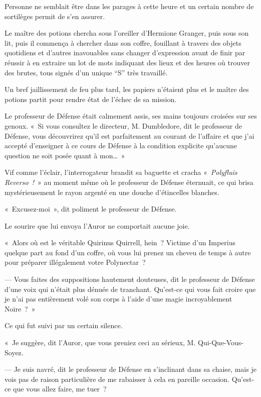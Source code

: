 Personne ne semblait être dans les parages à cette heure et un certain nombre de sortilèges permit de s'en assurer.

Le maître des potions chercha sous l'oreiller d'Hermione Granger, puis sous son lit, puis il commença à chercher dans son coffre, fouillant à travers des objets quotidiens et d'autres inavouables sans changer d'expression avant de finir par réussir à en extraire un lot de mots indiquant des lieux et des heures où trouver des brutes, tous signés d'un unique “S” très travaillé.

Un bref jaillissement de feu plus tard, les papiers n'étaient plus et le maître des potions partit pour rendre état de l'échec de sa mission.

\later

Le professeur de Défense était calmement assis, ses mains toujours croisées sur ses genoux. «~Si vous consultez le directeur, M. Dumbledore, dit le professeur de Défense, vous découvrirez qu'il est parfaitement au courant de l'affaire et que j'ai accepté d'enseigner à ce cours de Défense à la condition explicite qu'aucune question ne soit posée quant à mon…~»

Vif comme l'éclair, l'interrogateur brandit sa baguette et cracha «~\emph{Polyfluis Reverso~!}~» au moment même où le professeur de Défense éternuait, ce qui brisa mystérieusement le rayon argenté en une douche d'étincelles blanches.

«~Excusez-moi~», dit poliment le professeur de Défense.

Le sourire que lui envoya l'Auror ne comportait aucune joie.

«~Alors où est le véritable Quirinus Quirrell, hein~? Victime d'un Imperius quelque part au fond d'un coffre, où vous lui prenez un cheveu de temps à autre pour préparer illégalement votre Polynectar~?

--- Vous faites des suppositions hautement douteuses, dit le professeur de Défense d'une voix qui n'était plus dénuée de tranchant. Qu'est-ce qui vous fait croire que je n'ai pas entièrement volé son corps à l'aide d'une magie incroyablement Noire~?~»

Ce qui fut suivi par un certain silence.

«~Je suggère, dit l'Auror, que vous preniez ceci au sérieux, M. Qui-Que-Vous-Soyez.

--- Je suis navré, dit le professeur de Défense en s'inclinant dans sa chaise, mais je vois pas de raison particulière de me rabaisser à cela en pareille occasion. Qu'est-ce que vous allez faire, me tuer~?

